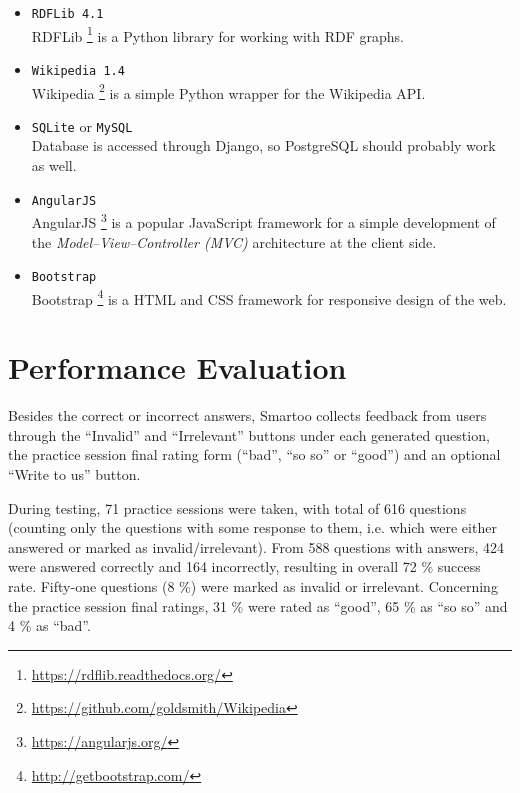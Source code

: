 \documentclass[12pt, twoside]{fithesis2}
\renewcommand{\_}{\leavevmode \kern0.07em\vbox{\hrule width0.4em}}
\newcommand{\squarebullet}{\textcolor{black}{\raisebox{0.15em}{\rule{4pt}{4pt}}}}
\newcommand{\emptysquarebullet}{\textcolor{black}{\raisebox{0.10em}{\tiny$\square$}}}
\newenvironment{myItemize}{
  \begin{itemize}[leftmargin=2em,rightmargin=1em,itemsep=\parskip ,parsep=0em,topsep=0em,partopsep=0em]
  \renewcommand{\labelitemi}{\squarebullet}
  \renewcommand{\labelitemii}{\textbullet}
}{
  \end{itemize}
}
\begin{document}
\begin{myItemize}
\item \texttt{RDFLib 4.1}\\
RDFLib%
\footnote{\url{https://rdflib.readthedocs.org/}}
is a Python library for working with RDF graphs.

\item \texttt{Wikipedia 1.4}\\
Wikipedia%
\footnote{\url{https://github.com/goldsmith/Wikipedia}}
is a simple Python wrapper for the Wikipedia API.

\item \texttt{SQLite} or \texttt{MySQL}\\
Database is accessed through Django,
so PostgreSQL should probably work as well.

\item \texttt{AngularJS}\\
AngularJS%
\footnote{\url{https://angularjs.org/}}
is a popular JavaScript framework for a simple development of the \emph{Model--View--Controller (MVC)} architecture at the client side.

\item \texttt{Bootstrap}\\
Bootstrap%
\footnote{\url{http://getbootstrap.com/}}
is a HTML and CSS framework for responsive design of the web.
\end{myItemize}





\section{Performance Evaluation}
\label{sec:performance-evaluation}

Besides the correct or incorrect answers, Smartoo collects feedback from users through
the ``Invalid'' and ``Irrelevant'' buttons under each generated question,
the practice session final rating form (``bad'', ``so so'' or ``good'')
and an optional ``Write to us'' button.

During testing, 71 practice sessions were taken, with total of 616 questions
(counting only the questions with some response to them, i.e. which were either answered or marked as invalid/irrelevant).
From 588 questions with answers, 424 were answered correctly and 164 incorrectly,
resulting in overall 72 \% success rate.
Fifty-one questions (8 \%) were marked as invalid or irrelevant.
Concerning the practice session final ratings, 31 \% were rated as ``good'', 65 \% as ``so so'' and 4 \% as ``bad''.
\end{document}
